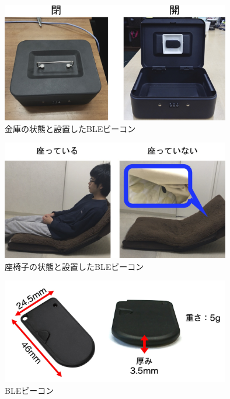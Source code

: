 \begin{figure}[H]
    \centering
    \includegraphics[width=10cm]{images/chapter3/kinkoW.jpg}
    \caption{金庫の状態と設置したBLEビーコン}
    \label{safe}
\end{figure}


\begin{figure}[H]
    \centering
    \includegraphics[width=10cm]{images/chapter3/zaisuW.jpg}
    \caption{座椅子の状態と設置したBLEビーコン}
    \label{chair}
\end{figure}


\begin{figure}[tbh]
    \centering
    \includegraphics[width=10cm]{images/chapter3/BLE_beacon_info.jpg}
    \caption{BLEビーコン}
    \label{beacon}
\end{figure}




